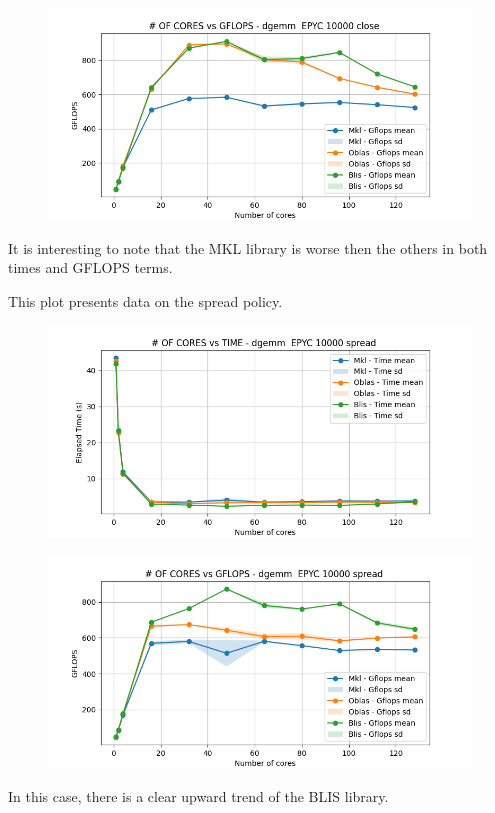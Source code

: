 \documentclass[12pt, titlepage]{report}
\begin{document}
\begin{figure}[H]
    \centering
    \includegraphics[width=\textwidth]{EPYC scalability/dgemm__EPYC_10000_close_gflops.png}
\end{figure}

It is interesting to note that the MKL library is worse then the others in both times and GFLOPS terms.

This plot presents data on the spread policy.
\begin{figure}[H]
    \centering
    \includegraphics[width=\textwidth]{EPYC scalability/dgemm__EPYC_10000_spread_time.png}
\end{figure}

\begin{figure}[H]
    \centering
    \includegraphics[width=\textwidth]{EPYC scalability/dgemm__EPYC_10000_spread_gflops.png}
\end{figure}
In this case, there is a clear upward trend of the BLIS library.
\end{document}

